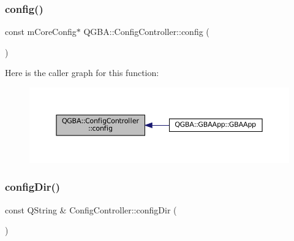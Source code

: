 \subsubsection{\texorpdfstring{config()}{config()}}
{\footnotesize\ttfamily const m\+Core\+Config$\ast$ Q\+G\+B\+A\+::\+Config\+Controller\+::config (\begin{DoxyParamCaption}{ }\end{DoxyParamCaption})\hspace{0.3cm}{\ttfamily [inline]}}

Here is the caller graph for this function\+:
\nopagebreak
\begin{figure}[H]
\begin{center}
\leavevmode
\includegraphics[width=350pt]{class_q_g_b_a_1_1_config_controller_a4f907fd63bc12690c053e57ef7e6c600_icgraph}
\end{center}
\end{figure}
\mbox{\label{class_q_g_b_a_1_1_config_controller_a853a8c4196e391ff95040f9c0f2fc0a0}} 
\subsubsection{\texorpdfstring{config\+Dir()}{configDir()}}
{\footnotesize\ttfamily const Q\+String \& Config\+Controller\+::config\+Dir (\begin{DoxyParamCaption}{ }\end{DoxyParamCaption})\hspace{0.3cm}{\ttfamily [static]}}

